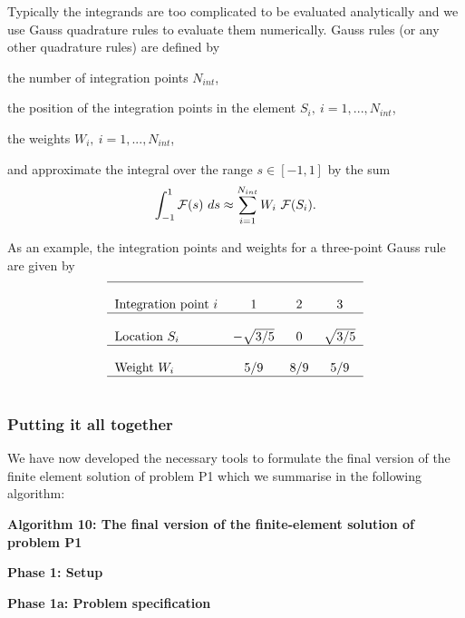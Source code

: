 Typically the integrands are too complicated to be evaluated analytically and we use Gauss quadrature rules to evaluate them numerically. Gauss rules (or any other quadrature rules) are defined by
\begin{DoxyItemize}
\item the number of integration points $N_{int} $,
\item the position of the integration points in the element $S_{i}, \ i=1,...,N_{int} $,
\item the weights $W_{i}, \ i=1,...,N_{int} $,
\end{DoxyItemize}

and approximate the integral over the range $ s\in [-1,1]$ by the sum \[ \int_{-1}^1 {\cal F}(s)\ ds \approx \sum_{i=1}^{N_{int}} W_i \ {\cal F}(S_i). \]

As an example, the integration points and weights for a three-\/point Gauss rule are given by \[ \mbox{ \begin{tabular}{l c c c} \hline \\ \mbox{Integration point $i$} & 1 & 2 & 3 \\ \hline \\ \mbox{Location $S_i$} & $-\sqrt{3/5}$ & $ 0$ & $\sqrt{3/5}$ \\ \hline \\ \mbox{Weight $W_i$} & 5/9 & 8/9 & 5/9 \\ \hline \\ \end{tabular} } \]



\hypertarget{index_altogether}{}\subsubsection{Putting it all together}\label{index_altogether}
We have now developed the necessary tools to formulate the final version of the finite element solution of problem P1 which we summarise in the following algorithm\+:

\begin{center} {\bfseries  Algorithm 10\+: The final version of the finite-\/element solution of problem P1 } \end{center}  {\bfseries  Phase 1\+: Setup}

{\bfseries  Phase 1a\+: Problem specification}


